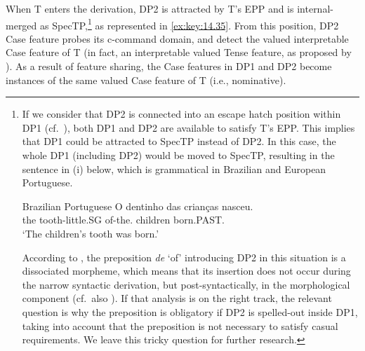 \documentclass[output=paper]{langsci/langscibook}
\begin{document}
When T enters the derivation, DP2 is attracted by T’s \gls{EPP} and is
internal-merged as SpecTP,\footnote{If we consider that DP2 is connected into
    an escape hatch position within DP1 (cf.\ \citealt{Avelar2006}), both DP1
    and DP2 are available to satisfy T’s \gls{EPP}. This implies that DP1 could
    be attracted to SpecTP instead of DP2. In this case, the whole DP1
    (including DP2) would be moved to SpecTP, resulting in the sentence in (i)
    below, which is grammatical in Brazilian and European Portuguese.

    \begin{exe}
        Brazilian Portuguese
        \sn
        \gll    O dentinho das   crianças nasceu.\\
                the tooth-little.SG of-the.\Pl{} children born.PAST.\Tsg{}\\
        \glt    ‘The children’s tooth was born.’
    \end{exe}

According to \citet{Avelar2006}, the preposition \emph{de} ‘of’ introducing DP2
in this situation is a dissociated morpheme, which means that its insertion
does not occur during the narrow syntactic derivation, but post-syntactically,
in the morphological component (cf.\ also \citealt{Raposo2002}). If that
analysis is on the right track, the relevant question is why the preposition is
obligatory if DP2 is spelled-out inside DP1, taking into account that the
preposition is not necessary to satisfy casual requirements.  We leave this
tricky question for further research.} as represented in \eqref{ex:key:14.35}. From
this position, DP2 Case feature probes its c-command domain, and detect the
valued interpretable Case feature of T (in fact, an interpretable valued Tense
feature, as proposed by \citealt{PesTor2004}). As a result of feature
sharing, the Case features in DP1 and DP2 become instances of the same valued
Case feature of T (i.e., nominative).

\ea%
    \label{ex:key:14.35}
    \z
\end{document}
